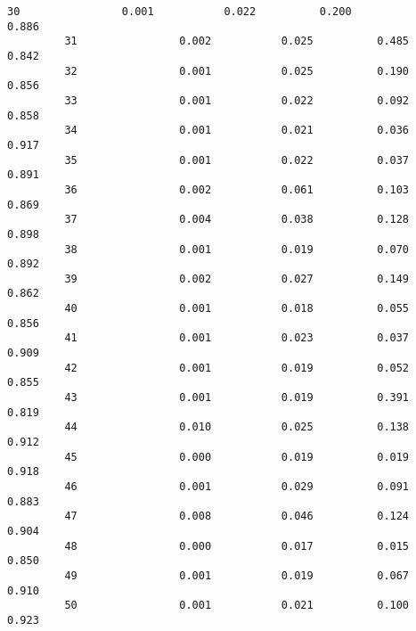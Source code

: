 \documentclass[11pt]{article}
\begin{document}
\begin{Verbatim}[commandchars=\\\{\}]
         30                0.001           0.022          0.200              0.886   
         31                0.002           0.025          0.485              0.842   
         32                0.001           0.025          0.190              0.856   
         33                0.001           0.022          0.092              0.858   
         34                0.001           0.021          0.036              0.917   
         35                0.001           0.022          0.037              0.891   
         36                0.002           0.061          0.103              0.869   
         37                0.004           0.038          0.128              0.898   
         38                0.001           0.019          0.070              0.892   
         39                0.002           0.027          0.149              0.862   
         40                0.001           0.018          0.055              0.856   
         41                0.001           0.023          0.037              0.909   
         42                0.001           0.019          0.052              0.855   
         43                0.001           0.019          0.391              0.819   
         44                0.010           0.025          0.138              0.912   
         45                0.000           0.019          0.019              0.918   
         46                0.001           0.029          0.091              0.883   
         47                0.008           0.046          0.124              0.904   
         48                0.000           0.017          0.015              0.850   
         49                0.001           0.019          0.067              0.910   
         50                0.001           0.021          0.100              0.923   
         

\end{Verbatim}
\end{document}
